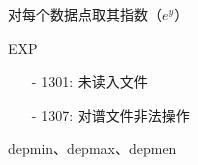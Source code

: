 \label{cmd:exp}

对每个数据点取其指数（$e^y$）

\begin{SACSTX}
EXP
\end{SACSTX}

\begin{itemize}
\item[-]1301: 未读入文件
\item[-]1307: 对谱文件非法操作
\end{itemize}

depmin、depmax、depmen
